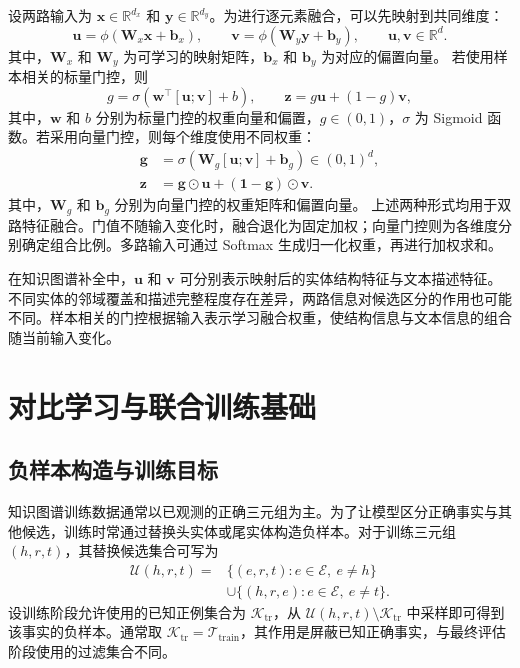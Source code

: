 设两路输入为 $\mathbf{x}\in\mathbb{R}^{d_x}$ 和 $\mathbf{y}\in\mathbb{R}^{d_y}$。为进行逐元素融合，可以先映射到共同维度：
\begin{equation}
    \mathbf{u}=\phi(\mathbf{W}_x\mathbf{x}+\mathbf{b}_x),\qquad
    \mathbf{v}=\phi(\mathbf{W}_y\mathbf{y}+\mathbf{b}_y),\qquad
    \mathbf{u},\mathbf{v}\in\mathbb{R}^{d}.
\end{equation}
其中，$\mathbf{W}_x$ 和 $\mathbf{W}_y$ 为可学习的映射矩阵，$\mathbf{b}_x$ 和 $\mathbf{b}_y$ 为对应的偏置向量。
若使用样本相关的标量门控，则
\begin{equation}
    g=\sigma(\mathbf{w}^{\top}[\mathbf{u};\mathbf{v}]+b),\qquad
    \mathbf{z}=g\mathbf{u}+(1-g)\mathbf{v},
    \label{eq:bg_scalar_gate}
\end{equation}
其中，$\mathbf{w}$ 和 $b$ 分别为标量门控的权重向量和偏置，$g\in(0,1)$，$\sigma$ 为 Sigmoid 函数。若采用向量门控，则每个维度使用不同权重：
\begin{align}
    \mathbf{g}&=\sigma(\mathbf{W}_g[\mathbf{u};\mathbf{v}]+\mathbf{b}_g)
       \in(0,1)^d,\\
    \mathbf{z}&=\mathbf{g}\odot\mathbf{u}
       +(\mathbf{1}-\mathbf{g})\odot\mathbf{v}.
    \label{eq:bg_vector_gate}
\end{align}
其中，$\mathbf{W}_g$ 和 $\mathbf{b}_g$ 分别为向量门控的权重矩阵和偏置向量。
上述两种形式均用于双路特征融合。门值不随输入变化时，融合退化为固定加权；向量门控则为各维度分别确定组合比例。多路输入可通过 Softmax 生成归一化权重，再进行加权求和。

在知识图谱补全中，$\mathbf{u}$ 和 $\mathbf{v}$ 可分别表示映射后的实体结构特征与文本描述特征。不同实体的邻域覆盖和描述完整程度存在差异，两路信息对候选区分的作用也可能不同。样本相关的门控根据输入表示学习融合权重，使结构信息与文本信息的组合随当前输入变化。

\section{对比学习与联合训练基础}

\subsection{负样本构造与训练目标}

知识图谱训练数据通常以已观测的正确三元组为主。为了让模型区分正确事实与其他候选，训练时常通过替换头实体或尾实体构造负样本\cite{bordes2013translating}。对于训练三元组 $(h,r,t)$，其替换候选集合可写为
\begin{equation}
\begin{aligned}
    \mathcal{U}(h,r,t)={}&
       \{(e,r,t):e\in\mathcal{E},\ e\ne h\}\\
       &\cup\{(h,r,e):e\in\mathcal{E},\ e\ne t\}.
\end{aligned}
    \label{eq:bg_corruption}
\end{equation}
设训练阶段允许使用的已知正例集合为 $\mathcal{K}_{\mathrm{tr}}$，从 $\mathcal{U}(h,r,t)\setminus\mathcal{K}_{\mathrm{tr}}$ 中采样即可得到该事实的负样本。通常取 $\mathcal{K}_{\mathrm{tr}}=\mathcal{T}_{\mathrm{train}}$，其作用是屏蔽已知正确事实，与最终评估阶段使用的过滤集合不同。


